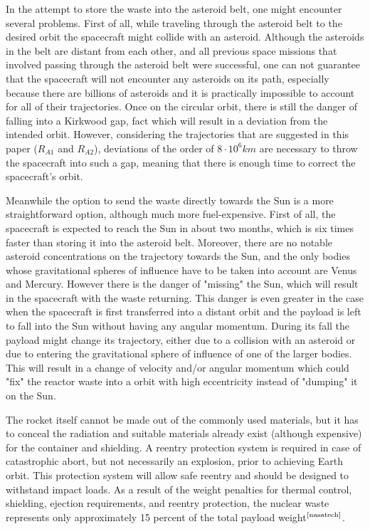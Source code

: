 \documentclass[onecolumn,12pt]{article}
\numberwithin{equation}{section}
\begin{document}
In the attempt to store the waste into the asteroid belt, one might encounter several problems. First of all, while traveling through the asteroid belt to the desired orbit the spacecraft might collide with an asteroid. Although the asteroids in the belt are distant from each other, and all previous space missions that involved passing through the asteroid belt were successful, one can not guarantee that the spacecraft will not encounter any asteroids on its path, especially because there are billions of asteroids and it is practically impossible to account for all of their trajectories. Once on the circular orbit, there is still the danger of falling into a Kirkwood gap, fact which will result in a deviation from the intended orbit. However, considering the trajectories that are suggested in this paper ($R_{A1}$ and $R_{A2}$), deviations of the order of $8 \cdot 10^6 km$ are necessary to throw the spacecraft into such a gap, meaning that there is enough time to correct the spacecraft's orbit.

Meanwhile the option to send the waste directly towards the Sun is a more straightforward option, although much more fuel-expensive. First of all, the spacecraft is expected to reach the Sun in about two months, which is six times faster than storing it into the asteroid belt. Moreover, there are no notable asteroid concentrations on the trajectory towards the Sun, and the only bodies whose gravitational spheres of influence have to be taken into account are Venus and Mercury. However there is the danger of "missing" the Sun, which will result in the spacecraft with the waste returning. This danger is even greater in the case when the spacecraft is first transferred into a distant orbit and the payload is left to fall into the Sun without having any angular momentum. During its fall the payload might change its trajectory, either due to a collision with an asteroid or due to entering the gravitational sphere of influence of one of the larger bodies. This will result in a change of velocity and/or angular momentum which could "fix" the reactor waste into a orbit with high eccentricity instead of "dumping" it on the Sun.

The rocket itself cannot be made out of the commonly used materials, but it has to conceal the radiation and suitable materials already exist (although expensive) for the container and shielding. A reentry protection system is required in case of catastrophic abort, but not necessarily an explosion, prior to achieving Earth orbit. This protection system will allow safe reentry and should be designed to withstand impact loads. As a result of the weight penalties for thermal control, shielding, ejection requirements, and reentry protection, the nuclear waste represents only approximately 15 percent of the total payload weight$^{\text{\cite{nasatech}}}$.
\end{document}

